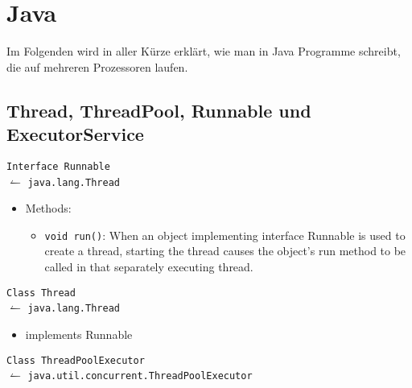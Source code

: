 \chapter{Java}

Im Folgenden wird in aller Kürze erklärt, wie man in Java Programme schreibt,
die auf mehreren Prozessoren laufen.

\section{Thread, ThreadPool, Runnable und ExecutorService}
\texttt{Interface Runnable}\\
\-\hspace{0.8cm}$\leftharpoonup$ \texttt{java.lang.Thread}%
\begin{itemize}
    \item Methods: 
    \begin{itemize}
        \item \texttt{void run()}: When an object implementing interface 
          Runnable is used to create a thread, starting the thread causes the 
          object's run method to be called in that separately executing thread.
    \end{itemize}
\end{itemize}
\texttt{Class Thread}\\
\-\hspace{0.8cm}$\leftharpoonup$ \texttt{java.lang.Thread}%
\begin{itemize}
    \item implements Runnable
\end{itemize}
\texttt{Class ThreadPoolExecutor}\\
\-\hspace{0.8cm}$\leftharpoonup$ \texttt{java.util.concurrent.ThreadPoolExecutor}


\begin{beispiel}
    \inputminted[numbersep=5pt, tabsize=4]{java}{scripts/java/executer-service-future-example.java}
\end{beispiel}

